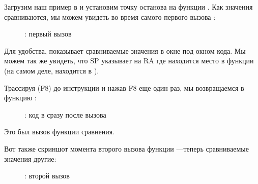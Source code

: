﻿\clearpage
{}
\myindex{\olly}

Загрузим наш пример в \olly и установим точку останова на функции \comp{}.
Как значения сравниваются, мы можем увидеть во время самого первого вызова \comp{}:

\begin{figure}[H]
\centering
{}
\caption{\olly: первый вызов \comp}
\label{fig:qsort_olly1}
\end{figure}

Для удобства, \olly показывает сравниваемые значения в окне под окном кода.
Мы можем так же увидеть, что \ac{SP} указывает на \ac{RA} где находится место в функции \qsort (на самом деле, находится в ).

\clearpage
Трассируя (F8) до инструкции  и нажав F8 еще один раз, мы возвращаемся в функцию \qsort:

\begin{figure}[H]
\centering
{}
\caption{\olly: код в \qsort сразу после вызова \comp}
\label{fig:qsort_olly2}
\end{figure}

Это был вызов функции сравнения.

\clearpage
Вот также скриншот момента второго вызова функции \comp{}---теперь сравниваемые значения другие:

\begin{figure}[H]
\centering
{}
\caption{\olly: второй вызов \comp}
\label{fig:qsort_olly3}
\end{figure}

